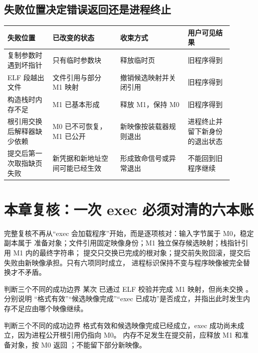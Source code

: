 \subsection{失败位置决定错误返回还是进程终止}

\begin{longtable}{|L{0.18\linewidth}|L{0.27\linewidth}|L{0.27\linewidth}|L{0.18\linewidth}|}
\hline
失败位置 & 已改变的状态 & 收束方式 & 用户可见结果 \\ \hline
复制参数时遇到坏指针 & 只有临时参数块 & 释放临时页 & 旧程序得到  \\\tablerowrule
ELF 段越出文件 & 文件引用与部分 M1 映射 & 撤销候选映射并关闭引用 & 旧程序得到  \\\tablerowrule
构造栈时内存不足 & M1 已基本形成 & 释放 M1，保持 M0 & 旧程序得到  \\\tablerowrule
根引用交换后解释器缺少依赖 & M0 已不可恢复，M1 已公开 & 新映像按装载器规则退出 & 进程终止并留下新身份的退出状态 \\\tablerowrule
提交后第一次取指缺页失败 & 新凭据和新地址空间可能已经生效 & 形成致命信号或异常退出 & 不能回到旧程序继续 \\ \hline
\end{longtable}

\section{本章复核：一次 exec 必须对清的六本账}

完整复核不再从“exec 会加载程序”开始，而是逐项核对：输入字节属于 M0，稳定副本属于
准备对象；文件引用固定映像身份；M1 独立保存候选映射；栈指针引用 M1 内的最终字符串；
提交只交换已完成的根对象；提交前失败回滚，提交后失败由新映像承担。只有六项同时成立，
进程标识保持不变与程序映像被完全替换才不矛盾。

\begin{chapterexercise}{判断三个不同的成功边界}
某次  已通过 ELF 校验并完成 M1 映射，但尚未交换 。分别说明
“格式有效”“候选映像完成”“exec 已成功”是否成立，并指出此时发生内存不足应由哪个映像继续。
\end{chapterexercise}

\begin{chapteranswer}{判断三个不同的成功边界}
格式有效和候选映像完成已经成立，exec 成功尚未成立，因为进程公开根引用仍指向 M0。
内存不足发生在提交前，应释放 M1 和准备对象，按 M0 返回 ；不能留下部分新映像。
\end{chapteranswer}

